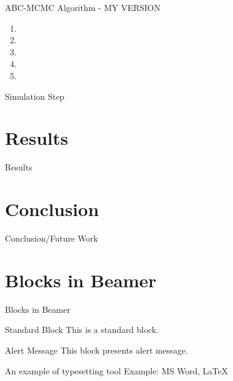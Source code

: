 \documentclass{beamer}
\begin{document}
	\begin{frame}{ABC-MCMC Algorithm - MY VERSION}
		
		\begin{enumerate}
			\item 
			\item
			\item
			\item
			\item
		\end{enumerate}
	
	\end{frame}

	\begin{frame}{Simulation Step}
	
	
	\end{frame}

	\section{Results}
	\begin{frame}{Results}
		
		
	\end{frame}

	\section{Conclusion}
	\begin{frame}{Conclusion/Future Work}
		
		
	\end{frame}
		
	\section{Blocks in Beamer}
	\begin{frame}{Blocks in Beamer}
		\begin{block}{Standard Block}
			This is a standard block.
		\end{block}
		\begin{alertblock}{Alert Message}
			This block presents alert message.
		\end{alertblock}
		\begin{exampleblock}{An example of typesetting tool}
			Example: MS Word, \LaTeX{}
		\end{exampleblock}
	\end{frame} 
	
\end{document}
